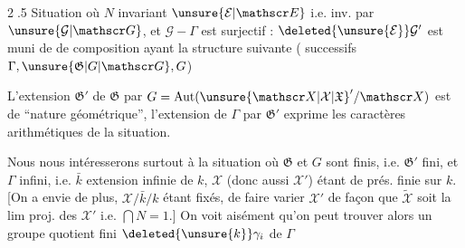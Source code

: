 \textcircled{2.5} Situation où $N$ invariant  $\unsure{\mathcal E|\mathscr E}$ i.e. inv. par $\unsure{\mathcal G|\mathscr G}$, et $\mathcal G\mathbin{-}\Gamma$ est surjectif : $\deleted{\unsure{\mathcal E}}\mathcal G'$ est  muni de  de composition ayant la structure suivante ( successifs $\Gamma,\unsure{\mathfrak G|G|\mathscr G},G$)

L’extension $\mathfrak G'$ de $\mathfrak G$ par $G=\mathrm{Aut}(\unsure{\mathscr X|\mathcal X|\mathfrak X}'/\mathscr X)$ est de ``nature géométrique'', l’extension de $\Gamma$ par $\mathfrak G'$ exprime les caractères arithmétiques de la situation.

Nous nous intéresserons surtout à la situation où $\mathfrak G$ et $G$ sont finis, i.e. $\mathfrak G'$ fini, et $\Gamma$ infini, i.e. $\bar k$ extension infinie de $k$,  $\mathscr X$  (donc aussi $\mathscr X'$) étant de prés. finie sur $k$. [On a envie de plus, $\mathscr X/\bar k/k$ étant fixés, de faire varier $\mathscr X'$  de façon que $\widetilde{\mathscr X}$ soit la lim proj. des $\mathscr X'$ i.e. $\bigcap N=1$.] On voit aisément qu’on peut trouver alors un groupe quotient fini $\deleted{\unsure{k}}\gamma_i$  de $\Gamma$
